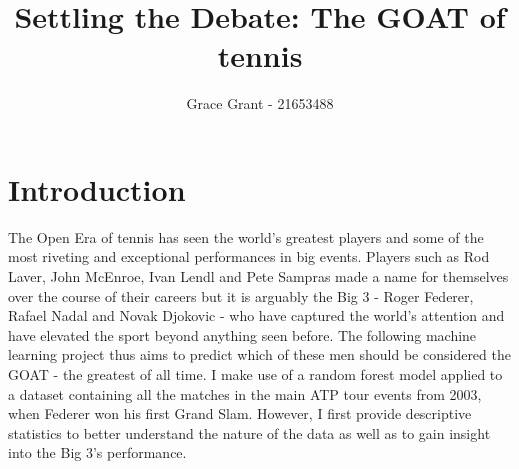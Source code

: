 \documentclass[11pt,preprint, authoryear]{elsarticle}
\numberwithin{equation}{section}
\numberwithin{figure}{section}
\numberwithin{table}{section}
\begin{document}
\begin{frontmatter}  %

\title{Settling the Debate: The GOAT of tennis}





\author[Add1]{Grace Grant - 21653488}





\address[Add1]{Stellenbosch University, Stellenbosch, South Africa}



\vspace{1cm}





\vspace{0.5cm}

\end{frontmatter}

\setcounter{footnote}{0}



\pagestyle{fancy}
\chead{}
\rhead{}
\lfoot{}
\rfoot{}
\lhead{}
\cfoot{}


\headsep 35pt %




\hypertarget{introduction}{%
\section{\texorpdfstring{Introduction
\label{Introduction}}{Introduction }}\label{introduction}}

The Open Era of tennis has seen the world's greatest players and some of
the most riveting and exceptional performances in big events. Players
such as Rod Laver, John McEnroe, Ivan Lendl and Pete Sampras made a name
for themselves over the course of their careers but it is arguably the
Big 3 - Roger Federer, Rafael Nadal and Novak Djokovic - who have
captured the world's attention and have elevated the sport beyond
anything seen before. The following machine learning project thus aims
to predict which of these men should be considered the GOAT - the
greatest of all time. I make use of a random forest model applied to a
dataset containing all the matches in the main ATP tour events from
2003, when Federer won his first Grand Slam. However, I first provide
descriptive statistics to better understand the nature of the data as
well as to gain insight into the Big 3's performance.
\end{document}
